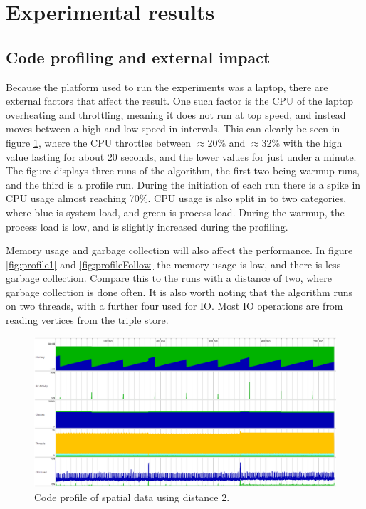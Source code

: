 \section{Experimental results}
\label{sec:experimentalResults}
\subsection{Code profiling and external impact}
Because the platform used to run the experiments was a laptop, there are external factors that affect the result. One such factor is the CPU of the laptop overheating and throttling, meaning it does not run at top speed, and instead moves between a high and low speed in intervals. This can clearly be seen in figure \ref{fig:profile2}, where the CPU throttles between $\approx$20\% and $\approx$32\% with the high value lasting for about 20 seconds, and the lower values for just under a minute. The figure displays three runs of the algorithm, the first two being warmup runs, and the third is a profile run. During the initiation of each run there is a spike in CPU usage almost reaching 70\%. CPU usage is also split in to two categories, where blue is system load, and green is process load. During the warmup, the process load is low, and is slightly increased during the profiling.

Memory usage and garbage collection will also affect the performance. In figure \ref{fig:profile1} and \ref{fig:profileFollow} the memory usage is low, and there is less garbage collection. Compare this to the runs with a distance of two, where garbage collection is done often. It is also worth noting that the algorithm runs on two threads, with a further four used for IO. Most IO operations are from reading vertices from the triple store.

\begin{figure}[hb]
	\centering
	\includegraphics[scale=0.25]{figs/profile2.png}
	\caption{Code profile of spatial data using distance 2.}
	\label{fig:profile2}
\end{figure}
 
